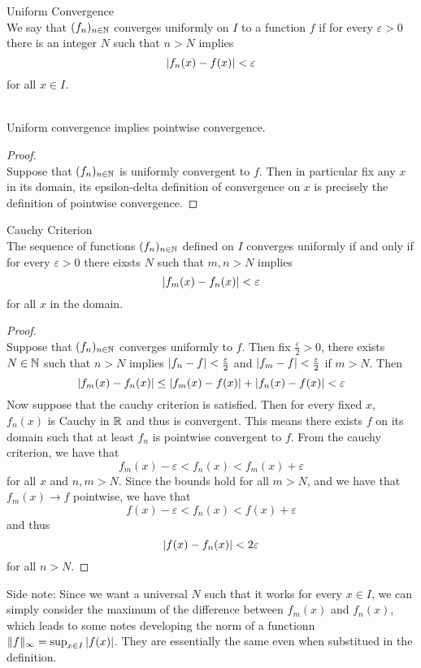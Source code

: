 \documentclass[a4paper]{article}
\begin{document}
\begin{defn}{Uniform Convergence}{}\\ We say that $(f_n)_{n\in\mathbb{N}}$ converges uniformly on $I$ to a function $f$ if for every $\varepsilon>0$ there is an integer $N$ such that $n>N$ implies $$\abs{f_n(x)-f(x)}<\varepsilon$$ for all $x\in I$. 
\end{defn}

\begin{crl}{}{}\\ Uniform convergence implies pointwise convergence. 
\begin{proof}\\ Suppose that $(f_n)_{n\in\mathbb{N}}$ is uniformly convergent to $f$. Then in particular fix any $x$ in its domain, its epsilon-delta definition of convergence on $x$ is precisely the definition of pointwise convergence. 
\end{proof}
\end{crl}

\begin{thm}{Cauchy Criterion}{}\\ The sequence of functions $(f_n)_{n\in\mathbb{N}}$ defined on $I$ converges uniformly if and only if for every $\varepsilon>0$ there eixsts $N$ such that $m,n>N$ implies $$\abs{f_m(x)-f_n(x)}<\varepsilon$$ for all $x$ in the domain. 
\begin{proof}\\
Suppose that $(f_n)_{n\in\mathbb{N}}$ converges uniformly to $f$. Then fix $\frac{\varepsilon}{2}>0$, there exists $N\in\mathbb{N}$ such that $n>N$ implies $\abs{f_n-f}<\frac{\varepsilon}{2}$ and $\abs{f_m-f}<\frac{\varepsilon}{2}$ if $m>N$. Then $$\abs{f_m(x)-f_n(x)}\leq\abs{f_m(x)-f(x)}+\abs{f_n(x)-f(x)}<\varepsilon$$
Now suppose that the cauchy criterion is satisfied. Then for every fixed $x$, $f_n(x)$ is Cauchy in $\mathbb{R}$ and thus is convergent. This means there exists $f$ on its domain such that at least $f_n$ is pointwise convergent to $f$. From the cauchy criterion, we have that $$f_m(x)-\varepsilon<f_n(x)<f_m(x)+\varepsilon$$ for all $x$ and $n,m>N$. Since the bounds hold for all $m>N$, and we have that $f_m(x)\to f$ pointwise, we have that $$f(x)-\varepsilon<f_n(x)<f(x)+\varepsilon$$ and thus $$\abs{f(x)-f_n(x)}<2\varepsilon$$ for all $n>N$. 
\end{proof}
\end{thm}

Side note: Since we want a universal $N$ such that it works for every $x\in I$, we can simply consider the maximum of the difference between $f_m(x)$ and $f_n(x)$, which leads to some notes developing the norm of a functionn $\|f\|_{\infty}=\sup_{x\in I}\abs{f(x)}$. They are essentially the same even when substitued in the definition. 
\end{document}
